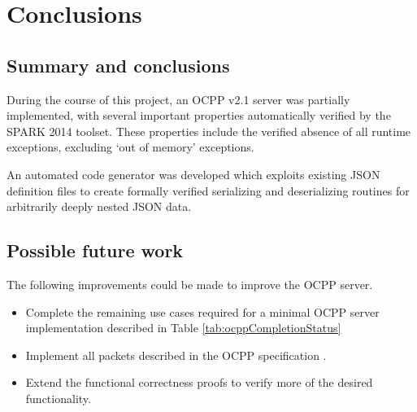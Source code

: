 \documentclass[12pt,openany,a4paper]{book}
\begin{document}
\pagebreak

\chapter{Conclusions}
\section{Summary and conclusions}

During the course of this project, an OCPP v2.1 server was partially implemented, with several important properties automatically verified by the SPARK 2014 toolset. These properties include the verified absence of all runtime exceptions, excluding `out of memory' exceptions. 

An automated code generator was developed which exploits existing JSON definition files to create formally verified serializing and deserializing routines for arbitrarily deeply nested JSON data.


\section{Possible future work}
The following improvements could be made to improve the OCPP server.
\begin {itemize}
	\item Complete the remaining use cases required for a minimal OCPP server implementation described in Table \ref{tab:ocppCompletionStatus}
	\item Implement all packets described in the OCPP specification \cite{ocpp}.
	\item Extend the functional correctness proofs to verify more of the desired functionality.
\end{itemize}


\appendix


\newpage
{}
\mbox{}
\newpage


\end{document}
